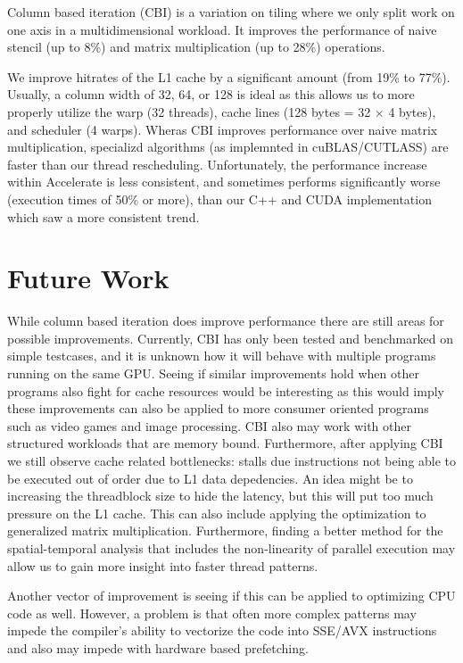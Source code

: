Column based iteration (CBI) is a variation on tiling where we only split work on one axis in a multidimensional workload. 
It improves the performance of naive stencil (up to 8\%) and matrix multiplication (up to 28\%) operations.

We improve hitrates of the L1 cache by a significant amount (from 19\% to 77\%).
Usually, a column width of 32, 64, or 128 is ideal as this allows us to more properly utilize the warp (32 threads), cache lines (128 bytes = 32 $\times$ 4 bytes), and scheduler (4 warps).
Wheras CBI improves performance over naive matrix multiplication, specializd algorithms (as implemnted in cuBLAS/CUTLASS) are faster than our thread rescheduling.
Unfortunately, the performance increase within Accelerate is less consistent, and sometimes performs significantly worse (execution times of 50\% or more), than our C++ and CUDA implementation which saw a more consistent trend. 

\section{Future Work}
While column based iteration does improve performance there are still areas for possible improvements.
Currently, CBI has only been tested and benchmarked on simple testcases, and it is unknown how it will behave with multiple programs running on the same GPU.
Seeing if similar improvements hold when other programs also fight for cache resources would be interesting as this would imply these improvements can also be applied to more consumer oriented programs such as video games and image processing.
CBI also may work with other structured workloads that are memory bound.
Furthermore, after applying CBI we still observe cache related bottlenecks: stalls due instructions not being able to be executed out of order due to L1 data depedencies.
An idea might be to increasing the threadblock size to hide the latency, but this will put too much pressure on the L1 cache.
This can also include applying the optimization to generalized matrix multiplication.
Furthermore, finding a better method for the spatial-temporal analysis that includes the non-linearity of parallel execution may allow us to gain more insight into faster thread patterns.

Another vector of improvement is seeing if this can be applied to optimizing CPU code as well.
However, a problem is that often more complex patterns may impede the compiler's ability to vectorize the code into SSE/AVX instructions and also may impede with hardware based prefetching.
